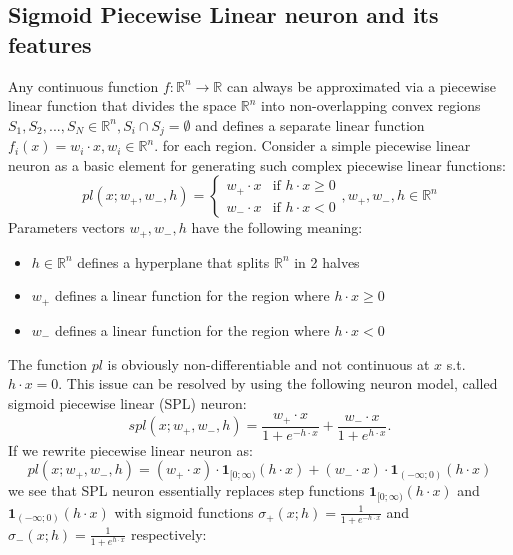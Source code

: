 \documentclass[sn-apa]{sn-jnl}%
\begin{document}
\subsection{Sigmoid Piecewise Linear neuron and its features}\label{subsec51}
Any continuous function $f: \mathbb{R}^n \to \mathbb{R} $ can always be approximated via a piecewise linear function that divides the space $\mathbb{R}^n$ into non-overlapping convex regions $S_1,S_2,...,S_N \in \mathbb{R}^n, S_i \cap S_j = \emptyset $  and defines a separate linear function $f_i(x) = w_i \cdot x, w_i \in \mathbb{R}^n.$ for each region. Consider a simple piecewise linear neuron as a basic element for generating such complex piecewise linear functions:
\begin{equation}
  pl(x;w_+,w_-,h) =
    \begin{cases}
      w_+ \cdot x & \text{if $h \cdot x \ge 0$}\\
      w_- \cdot x & \text{if $h \cdot x < 0$}
    \end{cases}
    , w_+, w_-, h \in \mathbb{R}^n \label{eq7}
\end{equation}
Parameters vectors $w_+,w_-,h$ have the following meaning: 
\begin{itemize}
\item $h \in \mathbb{R}^n$ defines a hyperplane that splits $\mathbb{R}^n$ in 2 halves
\item $w_+$ defines a linear function for the region where $h \cdot x \ge 0$
\item $w_-$ defines a linear function for the region where $h \cdot x < 0 $
\end{itemize}
The function $pl$ is obviously non-differentiable and not continuous at $x$ s.t. $h \cdot x = 0$. This issue can be resolved by using the following neuron model, called sigmoid piecewise linear (SPL) neuron:
\begin{equation}
spl(x;w_+,w_-,h) = \frac{w_+ \cdot x}{1 + e^{-h \cdot x}} + \frac{w_- \cdot x}{1 + e^{h \cdot x}}. \label{eq8}
\end{equation}
If we rewrite piecewise linear neuron as:
\begin{equation}
pl(x;w_+,w_-,h) = (w_+ \cdot x) \cdot \boldsymbol{1}_{[0;\infty)}(h \cdot x) + 
   (w_- \cdot x) \cdot \boldsymbol{1}_{(-\infty;0)}(h \cdot x) \label{eq9}
\end{equation}
we see that SPL neuron essentially replaces step functions $\boldsymbol{1}_{[0;\infty)}(h \cdot x)$ and $\boldsymbol{1}_{(-\infty;0)}(h \cdot x)$ with sigmoid functions $ \sigma_+(x;h) = \frac{1}{1 + e^{-h \cdot x}} $ and $ \sigma_-(x;h) = \frac{1}{1 + e^{h \cdot x}} $ respectively:
\end{document}
